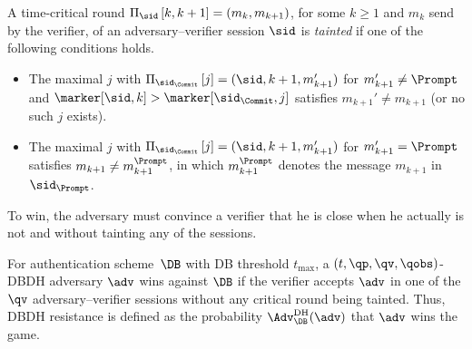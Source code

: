 \begin{definition}%
  \label{TaintedDH}
  A time-critical round \(\Xscript{\sid}{k, k+1} = (m_k, m_{k+1})\), for some 
  \(k\geq 1\) and \(m_k\) send by the verifier, of an adversary--verifier 
  session \(\sid\) is \emph{tainted} if one of the following conditions holds.
  \begin{itemize}
    \item The maximal \(j\) with \(\Xscript{\sid_{\Commit}}{j} = (\sid, k+1, 
      m_{k+1}')\) for \(m_{k+1}' \neq \Prompt\) and \(\marker[\sid, k] > 
      \marker[\sid_{\Commit}, j]\) satisfies \(m_{k+1}' \neq m_{k+1}\) (or no 
      such \(j\) exists).

    \item The maximal \(j\) with \(\Xscript{\sid_{\Commit}}{j} = (\sid, k+1, 
      m_{k+1}')\) for \(m_{k+1}' = \Prompt\) satisfies \(m_{k+1} \neq 
      m_{k+1}^{\Prompt}\), in which \(m_{k+1}^{\Prompt}\) denotes the message 
      \(m_{k+1}\) in \(\sid_{\Prompt}\).
  \end{itemize}
\end{definition}

To win, the adversary must convince a verifier that he is close when he 
actually is not and without tainting any of the sessions.

\begin{definition}%
  \label{DHresistance}
  For  authentication scheme~\(\DB\) with \ac{DB} threshold 
  \(t_{\max}\), a \((t, \qp, \qv, \qobs)\)-\ac{DBDH} adversary \(\adv\) wins 
  against \(\DB\) if the verifier accepts \(\adv\) in one of the \(\qv\) 
  adversary--verifier sessions without any critical round being tainted.
  Thus, \ac{DBDH} resistance is defined as the probability 
  \(\Adv_{\DB}^{\text{DH}}(\adv)\) that \(\adv\) wins the game.
\end{definition}

